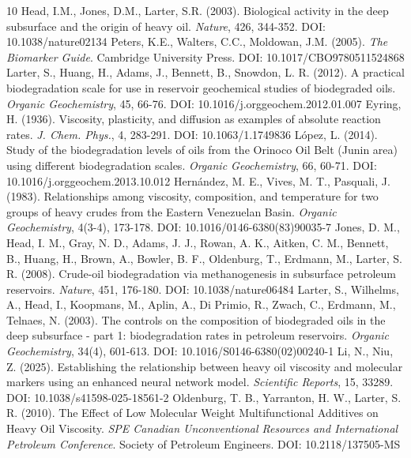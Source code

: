 \documentclass[review,12pt]{elsarticle}
\begin{document}
\begin{thebibliography}{10}
 Head, I.M., Jones, D.M., Larter, S.R. (2003). Biological activity in the deep subsurface and the origin of heavy oil. \textit{Nature}, 426, 344-352. DOI: 10.1038/nature02134
 Peters, K.E., Walters, C.C., Moldowan, J.M. (2005). \textit{The Biomarker Guide}. Cambridge University Press. DOI: 10.1017/CBO9780511524868
 Larter, S., Huang, H., Adams, J., Bennett, B., Snowdon, L. R. (2012). A practical biodegradation scale for use in reservoir geochemical studies of biodegraded oils. \textit{Organic Geochemistry}, 45, 66-76. DOI: 10.1016/j.orggeochem.2012.01.007
 Eyring, H. (1936). Viscosity, plasticity, and diffusion as examples of absolute reaction rates. \textit{J. Chem. Phys.}, 4, 283-291. DOI: 10.1063/1.1749836
 L\'opez, L. (2014). Study of the biodegradation levels of oils from the Orinoco Oil Belt (Junin area) using different biodegradation scales. \textit{Organic Geochemistry}, 66, 60-71. DOI: 10.1016/j.orggeochem.2013.10.012
 Hern\'andez, M. E., Vives, M. T., Pasquali, J. (1983). Relationships among viscosity, composition, and temperature for two groups of heavy crudes from the Eastern Venezuelan Basin. \textit{Organic Geochemistry}, 4(3-4), 173-178. DOI: 10.1016/0146-6380(83)90035-7
 Jones, D. M., Head, I. M., Gray, N. D., Adams, J. J., Rowan, A. K., Aitken, C. M., Bennett, B., Huang, H., Brown, A., Bowler, B. F., Oldenburg, T., Erdmann, M., Larter, S. R. (2008). Crude-oil biodegradation via methanogenesis in subsurface petroleum reservoirs. \textit{Nature}, 451, 176-180. DOI: 10.1038/nature06484
 Larter, S., Wilhelms, A., Head, I., Koopmans, M., Aplin, A., Di Primio, R., Zwach, C., Erdmann, M., Telnaes, N. (2003). The controls on the composition of biodegraded oils in the deep subsurface - part 1: biodegradation rates in petroleum reservoirs. \textit{Organic Geochemistry}, 34(4), 601-613. DOI: 10.1016/S0146-6380(02)00240-1
 Li, N., Niu, Z. (2025). Establishing the relationship between heavy oil viscosity and molecular markers using an enhanced neural network model. \textit{Scientific Reports}, 15, 33289. DOI: 10.1038/s41598-025-18561-2
 Oldenburg, T. B., Yarranton, H. W., Larter, S. R. (2010). The Effect of Low Molecular Weight Multifunctional Additives on Heavy Oil Viscosity. \textit{SPE Canadian Unconventional Resources and International Petroleum Conference}. Society of Petroleum Engineers. DOI: 10.2118/137505-MS
\end{thebibliography}
\end{document}
